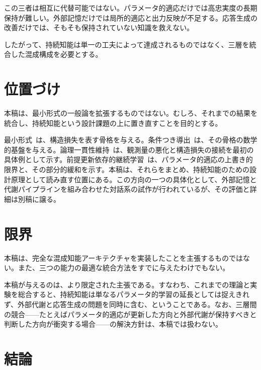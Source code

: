 \documentclass[12pt,a4paper]{article}
\begin{document}
この三者は相互に代替可能ではない。パラメータ的適応だけでは高忠実度の長期保持が難しい。外部記憶だけでは局所的適応と出力反映が不足する。応答生成の改善だけでは、そもそも保持されていない知識を救えない。

したがって、持続知能は単一の工夫によって達成されるものではなく、三層を統合した混成構成を必要とする。

\section{位置づけ}

本稿は、最小形式の一般論を拡張するものではない。むしろ、それまでの結果を統合し、持続知能という設計課題の上に置き直すことを目的とする。

最小形式~\cite{paper1}は、構造損失を表す骨格を与える。条件つき導出~\cite{paper2}は、その骨格の数学的基盤を与える。論理一貫性維持~\cite{paper3}は、観測量の悪化と構造損失の接続を最初の具体例として示す。前提更新依存的継続学習~\cite{paper4}は、パラメータ的適応の上書き的限界と、その部分的緩和を示す。本稿は、それらをまとめ、持続知能のための設計原理として読み直す位置にある。この方向の一つの具体化として、外部記憶と代謝パイプラインを組み合わせた対話系の試作が行われているが、その評価と詳細は別稿に譲る。

\section{限界}

本稿は、完全な混成知能アーキテクチャを実装したことを主張するものではない。また、三つの能力の最適な統合方法をすでに与えたわけでもない。

本稿が与えるのは、より限定された主張である。すなわち、これまでの理論と実験を総合すると、持続知能は単なるパラメータ的学習の延長としては捉えきれず、外部代謝と応答生成の問題を同時に含む、ということである。なお、三層間の競合——たとえばパラメータ的適応が更新した方向と外部代謝が保持すべきと判断した方向が衝突する場合——の解決方針は、本稿では扱わない。

\section{結論}
\end{document}
